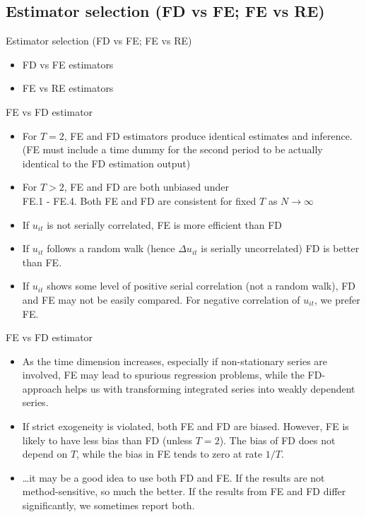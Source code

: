 \documentclass[usenames,dvipsnames]{beamer}
\begin{document}
\subsection*{Estimator selection (FD vs FE; FE vs RE)}
\begin{frame}{Estimator selection (FD vs FE; FE vs RE)}
\begin{itemize}
    \item FD vs FE estimators
    \bigskip
    \item FE vs RE estimators
\end{itemize}    
\end{frame}
\begin{frame}{FE vs FD estimator}
\begin{itemize}
\item For $T=2$, FE and FD estimators produce identical estimates and inference. (FE must include a time dummy for the second period to be actually identical to the FD estimation output)
\medskip
\item For $T>2$, FE and FD are both unbiased under \\FE.1 - FE.4. Both FE and FD are consistent for fixed $T$ as $N \rightarrow \infty$
\medskip
\item If $u_{it}$ is not serially correlated, FE is more efficient than FD
\medskip
\item If $u_{it}$ follows a random walk (hence $\Delta u_{it}$ is serially uncorrelated) FD is better than FE.
\medskip
\item If $u_{it}$ shows some level of positive serial correlation (not a random walk), FD and FE may not be easily compared. For negative correlation of $u_{it}$, we prefer FE.
\end{itemize}
\end{frame}
\begin{frame}{FE vs FD estimator}
\begin{itemize}
\item As the time dimension increases, especially if non-stationary series are involved, FE may lead to spurious regression problems, while the FD-approach helps us with transforming integrated series into weakly dependent series.
\medskip
\item If strict exogeneity is violated, both FE and FD are biased. However, FE is likely to have less bias than FD (unless $T=2$). The bias of FD does not depend on $T$, while the bias in FE tends to zero at rate $1/T$.
\medskip
\item \dots it may be a good idea to use both FD and FE. If the results are not method-sensitive, so much the better. If the results from FE and FD differ significantly, we sometimes report both.
\end{itemize}
\end{frame}
\end{document}

